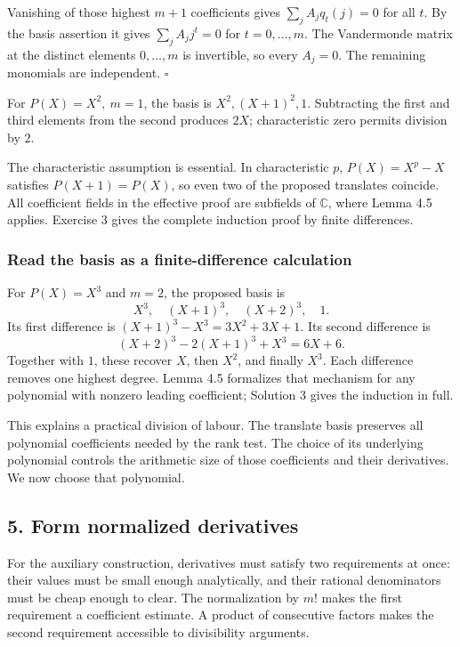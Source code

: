 \documentclass[
  11pt,
  a4paper,
]{article}
\begin{document}
Vanishing of those highest \(m+1\) coefficients gives
\(\sum_j A_jq_t(j)=0\) for all \(t\). By the basis assertion it gives
\(\sum_j A_jj^t=0\) for \(t=0,\ldots,m\). The Vandermonde matrix at the
distinct elements \(0,\ldots,m\) is invertible, so every \(A_j=0\). The
remaining monomials are independent. \(\square\)

For \(P(X)=X^2,\ m=1\), the basis is \(X^2,(X+1)^2,1\). Subtracting the
first and third elements from the second produces \(2X\); characteristic
zero permits division by \(2\).

The characteristic assumption is essential. In characteristic \(p\),
\(P(X)=X^p-X\) satisfies \(P(X+1)=P(X)\), so even two of the proposed
translates coincide. All coefficient fields in the effective proof are
subfields of \(\mathbb C\), where Lemma 4.5 applies. Exercise 3 gives
the complete induction proof by finite differences.

\subsubsection{Read the basis as a finite-difference
calculation}\label{read-the-basis-as-a-finite-difference-calculation}

For \(P(X)=X^3\) and \(m=2\), the proposed basis is \[
X^3,\quad (X+1)^3,\quad (X+2)^3,\quad 1.
\] Its first difference is \((X+1)^3-X^3=3X^2+3X+1\). Its second
difference is \[
(X+2)^3-2(X+1)^3+X^3=6X+6.
\] Together with \(1\), these recover \(X\), then \(X^2\), and finally
\(X^3\). Each difference removes one highest degree. Lemma 4.5
formalizes that mechanism for any polynomial with nonzero leading
coefficient; Solution 3 gives the induction in full.

This explains a practical division of labour. The translate basis
preserves all polynomial coefficients needed by the rank test. The
choice of its underlying polynomial controls the arithmetic size of
those coefficients and their derivatives. We now choose that polynomial.

\subsection{5. Form normalized
derivatives}\label{form-normalized-derivatives}

For the auxiliary construction, derivatives must satisfy two
requirements at once: their values must be small enough analytically,
and their rational denominators must be cheap enough to clear. The
normalization by \(m!\) makes the first requirement a coefficient
estimate. A product of consecutive factors makes the second requirement
accessible to divisibility arguments.
\end{document}
